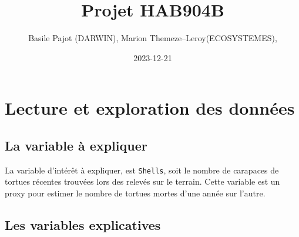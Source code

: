 \documentclass[
]{article}
\title{Projet HAB904B}
\author{Basile Pajot (DARWIN), Marion Themeze--Leroy(ECOSYSTEMES),}
\date{2023-12-21}
\begin{document}
\maketitle

{
\setcounter{tocdepth}{2}
\tableofcontents
}
\hypertarget{lecture-et-exploration-des-donnuxe9es}{%
\section{\texorpdfstring{\textbf{Lecture et exploration des
données}}{Lecture et exploration des données}}\label{lecture-et-exploration-des-donnuxe9es}}

\hypertarget{la-variable-uxe0-expliquer}{%
\subsection{La variable à expliquer}\label{la-variable-uxe0-expliquer}}

La variable d'intérêt à expliquer, est \texttt{Shells}, soit le nombre
de carapaces de tortues récentes trouvées lors des relevés sur le
terrain. Cette variable est un proxy pour estimer le nombre de tortues
mortes d'une année sur l'autre.

\hypertarget{les-variables-explicatives}{%
\subsection{Les variables
explicatives}\label{les-variables-explicatives}}
\end{document}

